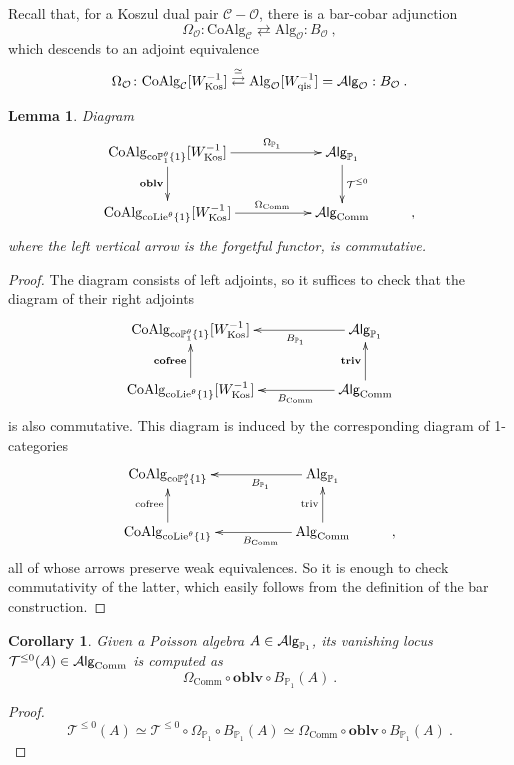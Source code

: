 \documentclass[10pt, oneside]{amsart}
\theoremstyle{plain}
\newtheorem{lemma}[equation]{Lemma}
\newtheorem{corollary}[equation]{Corollary}
\newcommand{\alg}{\mathrm{Alg}}
\newcommand{\Alg}{\mathcal{A}\text{\sf lg}}
\newcommand{\C}{\mathcal{C}}
\newcommand{\comm}{\mathrm{Comm}}
\newcommand{\coalg}{\mathrm{CoAlg}}
\newcommand{\ccolie}{\mathrm{coLie}^\theta}
\renewcommand{\O}{\mathcal{O}}
\newcommand{\PP}{\mathbb{P}}
\newcommand{\T}{\mathcal{T}}
\newcommand{\ccoP}{\mathrm{co}\PP^\theta}
\begin{document}
Recall that, for a Koszul dual pair $\C - \O$, there is a bar-cobar adjunction
\begin{equation*}
\Omega_\O \colon \coalg_\C \rightleftarrows \alg_\O : B_\O \:,
\end{equation*}
which descends to an adjoint equivalence
\begin{equation*}
\Omega_\O \colon \coalg_\C[W^{-1}_\text{Kos}] \stackrel{\simeq}{\rightleftarrows} \alg_\O[W^{-1}_\text{qis}] = \Alg_\O : B_\O \:.
\end{equation*}

\begin{lemma}
Diagram
\[\xymatrix{
\coalg_{\ccoP_1\{1\}}[W^{-1}_\text{Kos}] \ar[rr]^(0.6){\Omega_{\PP_1}}\ar[d]_{\mathbf{oblv}} && \Alg_{\PP_1} \ar[d]^{\mathcal{T}^{\le 0}} \\
\coalg_{\ccolie\{1\}}[W^{-1}_\text{Kos}] \ar[rr]^(0.6){\Omega_\comm} && \Alg_\comm & ,
}\]
where the left vertical arrow is the forgetful functor, is commutative.
\end{lemma}
\begin{proof}
The diagram consists of left adjoints, so it suffices to check that the diagram of their right adjoints
\[\xymatrix{
\coalg_{\ccoP_1\{1\}}[W^{-1}_\text{Kos}] && \Alg_{\PP_1} \ar[ll]^(0.4){B_{\PP_1}} \\
\coalg_{\ccolie\{1\}}[W^{-1}_\text{Kos}] \ar[u]^{\mathbf{cofree}} && \Alg_\comm \ar[ll]^(0.4){B_\comm} \ar[u]^{\mathbf{triv}}
}\]
is also commutative. This diagram is induced by the corresponding diagram of 1-categories
\[\xymatrix{
\coalg_{\ccoP_1\{1\}} && \alg_{\PP_1} \ar[ll]^(0.4){B_{\PP_1}} \\
\coalg_{\ccolie\{1\}} \ar[u]^{\text{cofree}} && \alg_\comm \ar[ll]^(0.4){B_\comm} \ar[u]^{\text{triv}} & ,
}\]
all of whose arrows preserve weak equivalences. So it is enough to check commutativity of the latter, which easily follows from the 
definition of the bar construction.
\end{proof}

\begin{corollary}
Given a Poisson algebra $A \in \Alg_{\PP_1}$, its vanishing locus $\T^{\le 0}(A) \in \Alg_\comm$ is computed as
\begin{equation*}
\Omega_\comm \circ \mathbf{oblv} \circ B_{\PP_1} (A) \:.
\end{equation*}
\end{corollary}
\begin{proof}
\begin{equation*}
\T^{\le 0}(A) \simeq \T^{\le 0} \circ \Omega_{\PP_1} \circ B_{\PP_1} (A) \simeq \Omega_\comm \circ \mathbf{oblv} \circ B_{\PP_1} (A) \:.
\end{equation*}
\end{proof}
\end{document}
